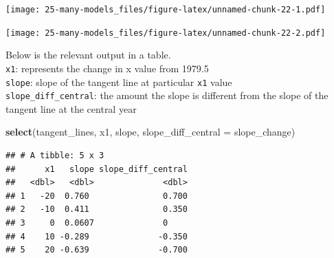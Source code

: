 \documentclass[]{book}
\newenvironment{Shaded}{\begin{snugshade}}{\end{snugshade}}
\newcommand{\DataTypeTok}[1]{\textcolor[rgb]{0.13,0.29,0.53}{#1}}
\newcommand{\KeywordTok}[1]{\textcolor[rgb]{0.13,0.29,0.53}{\textbf{#1}}}
\newcommand{\NormalTok}[1]{#1}
\newcommand{\OperatorTok}[1]{\textcolor[rgb]{0.81,0.36,0.00}{\textbf{#1}}}
\newcommand{\StringTok}[1]{\textcolor[rgb]{0.31,0.60,0.02}{#1}}
\theoremstyle{definition}
\theoremstyle{definition}
\theoremstyle{definition}
\theoremstyle{remark}
\begin{document}
\begin{enumerate}
  \texttt{[image: 25-many-models\_files/figure-latex/unnamed-chunk-22-1.pdf]}

\begin{Shaded}
\end{Shaded}

  \texttt{[image: 25-many-models\_files/figure-latex/unnamed-chunk-22-2.pdf]}

  Below is the relevant output in a table.\\
  \texttt{x1}: represents the change in x value from 1979.5\\
  \texttt{slope}: slope of the tangent line at particular \texttt{x1}
  value\\
  \texttt{slope\_diff\_central}: the amount the slope is different from
  the slope of the tangent line at the central year

\begin{Shaded}
\begin{Highlighting}[]
\KeywordTok{select}\NormalTok{(tangent_lines, x1, slope, }\DataTypeTok{slope_diff_central =}\NormalTok{ slope_change)}
\end{Highlighting}
\end{Shaded}

\begin{verbatim}
## # A tibble: 5 x 3
##      x1   slope slope_diff_central
##   <dbl>   <dbl>              <dbl>
## 1   -20  0.760               0.700
## 2   -10  0.411               0.350
## 3     0  0.0607              0    
## 4    10 -0.289              -0.350
## 5    20 -0.639              -0.700
\end{verbatim}


\end{enumerate}
\end{document}

